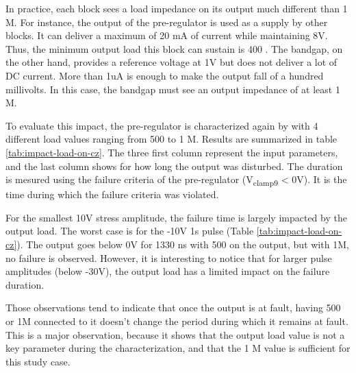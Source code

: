 In practice, each block sees a load impedance on its output much different than 1 M\textOmega{}.
For instance, the output of the pre-regulator is used as a supply by other blocks.
It can deliver a maximum of 20 mA of current while maintaining 8V.
Thus, the minimum output load this block can sustain is 400 \textOmega{}.
The bandgap, on the other hand, provides a reference voltage at 1V but does not deliver a lot of DC current.
More than 1uA is enough to make the output fall of a hundred millivolts.
In this case, the bandgap must see an output impedance of at least 1 M\textOmega{}.

To evaluate this impact, the pre-regulator is characterized again by with 4 different load values ranging from 500 \textOmega{} to 1 M\textOmega{}.
Results are summarized in table \ref{tab:impact-load-on-cz}.
The three first column represent the input parameters, and the last column shows for how long the output was disturbed.
The duration is mesured using the failure criteria of the pre-regulator (V\textsubscript{clamp9} < 0V).
It is the time during which the failure criteria was violated.

For the smallest 10V stress amplitude, the failure time is largely impacted by the output load.
The worst case is for the -10V 1\textmugreek{}s pulse (Table \ref{tab:impact-load-on-cz}).
The output goes below 0V for 1330 ns with 500\textOmega{} on the output, but with 1M\textOmega{}, no failure is observed.
However, it is interesting to notice that for larger pulse amplitudes (below -30V), the output load has a limited impact on the failure duration.

Those observations tend to indicate that once the output is at fault, having 500\textOmega{} or 1M\textOmega{} connected to it doesn't change the period during which it remains at fault.
This is a major observation, because it shows that the output load value is not a key parameter during the characterization, and that the 1 M\textOmega{} value is sufficient for this study case.

